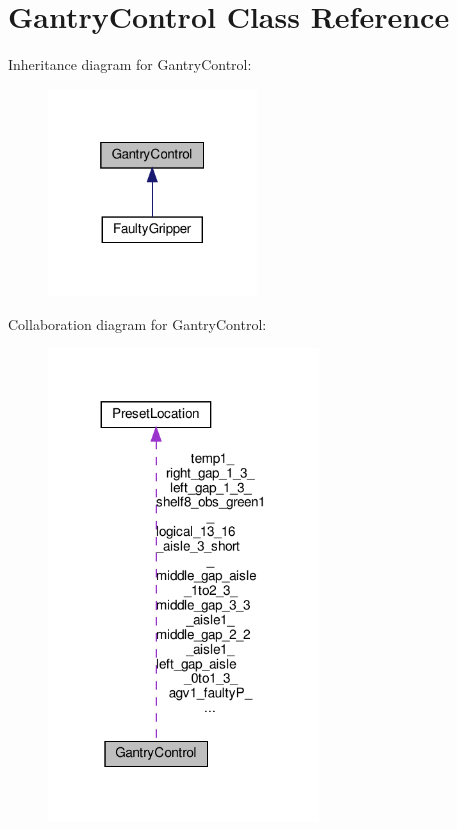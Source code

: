\hypertarget{classGantryControl}{}\section{Gantry\+Control Class Reference}
\label{classGantryControl}


Inheritance diagram for Gantry\+Control\+:
\nopagebreak
\begin{figure}[H]
\begin{center}
\leavevmode
\includegraphics[width=157pt]{classGantryControl__inherit__graph}
\end{center}
\end{figure}


Collaboration diagram for Gantry\+Control\+:
\nopagebreak
\begin{figure}[H]
\begin{center}
\leavevmode
\includegraphics[width=203pt]{classGantryControl__coll__graph}
\end{center}
\end{figure}
